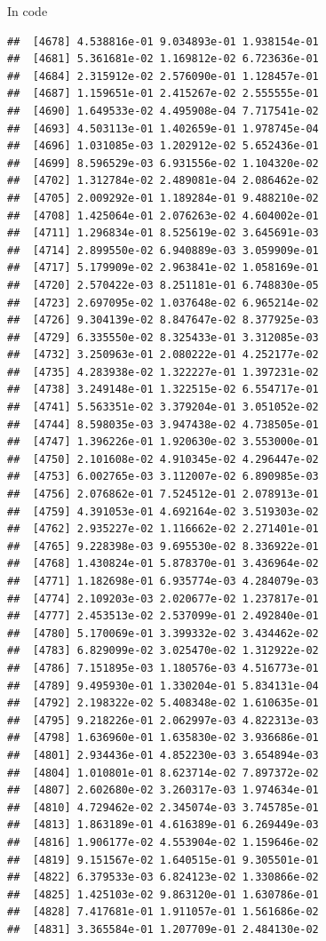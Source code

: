 \documentclass[ignorenonframetext,]{beamer}
\begin{document}
\begin{frame}[fragile]{In code}
\begin{verbatim}
##  [4678] 4.538816e-01 9.034893e-01 1.938154e-01
##  [4681] 5.361681e-02 1.169812e-02 6.723636e-01
##  [4684] 2.315912e-02 2.576090e-01 1.128457e-01
##  [4687] 1.159651e-01 2.415267e-02 2.555555e-01
##  [4690] 1.649533e-02 4.495908e-04 7.717541e-02
##  [4693] 4.503113e-01 1.402659e-01 1.978745e-04
##  [4696] 1.031085e-03 1.202912e-02 5.652436e-01
##  [4699] 8.596529e-03 6.931556e-02 1.104320e-02
##  [4702] 1.312784e-02 2.489081e-04 2.086462e-02
##  [4705] 2.009292e-01 1.189284e-01 9.488210e-02
##  [4708] 1.425064e-01 2.076263e-02 4.604002e-01
##  [4711] 1.296834e-01 8.525619e-02 3.645691e-03
##  [4714] 2.899550e-02 6.940889e-03 3.059909e-01
##  [4717] 5.179909e-02 2.963841e-02 1.058169e-01
##  [4720] 2.570422e-03 8.251181e-01 6.748830e-05
##  [4723] 2.697095e-02 1.037648e-02 6.965214e-02
##  [4726] 9.304139e-02 8.847647e-02 8.377925e-03
##  [4729] 6.335550e-02 8.325433e-01 3.312085e-03
##  [4732] 3.250963e-01 2.080222e-01 4.252177e-02
##  [4735] 4.283938e-02 1.322227e-01 1.397231e-02
##  [4738] 3.249148e-01 1.322515e-02 6.554717e-01
##  [4741] 5.563351e-02 3.379204e-01 3.051052e-02
##  [4744] 8.598035e-03 3.947438e-02 4.738505e-01
##  [4747] 1.396226e-01 1.920630e-02 3.553000e-01
##  [4750] 2.101608e-02 4.910345e-02 4.296447e-02
##  [4753] 6.002765e-03 3.112007e-02 6.890985e-03
##  [4756] 2.076862e-01 7.524512e-01 2.078913e-01
##  [4759] 4.391053e-01 4.692164e-02 3.519303e-02
##  [4762] 2.935227e-02 1.116662e-02 2.271401e-01
##  [4765] 9.228398e-03 9.695530e-02 8.336922e-01
##  [4768] 1.430824e-01 5.878370e-01 3.436964e-02
##  [4771] 1.182698e-01 6.935774e-03 4.284079e-03
##  [4774] 2.109203e-03 2.020677e-02 1.237817e-01
##  [4777] 2.453513e-02 2.537099e-01 2.492840e-01
##  [4780] 5.170069e-01 3.399332e-02 3.434462e-02
##  [4783] 6.829099e-02 3.025470e-02 1.312922e-02
##  [4786] 7.151895e-03 1.180576e-03 4.516773e-01
##  [4789] 9.495930e-01 1.330204e-01 5.834131e-04
##  [4792] 2.198322e-02 5.408348e-02 1.610635e-01
##  [4795] 9.218226e-01 2.062997e-03 4.822313e-03
##  [4798] 1.636960e-01 1.635830e-02 3.936686e-01
##  [4801] 2.934436e-01 4.852230e-03 3.654894e-03
##  [4804] 1.010801e-01 8.623714e-02 7.897372e-02
##  [4807] 2.602680e-02 3.260317e-03 1.974634e-01
##  [4810] 4.729462e-02 2.345074e-03 3.745785e-01
##  [4813] 1.863189e-01 4.616389e-01 6.269449e-03
##  [4816] 1.906177e-02 4.553904e-02 1.159646e-02
##  [4819] 9.151567e-02 1.640515e-01 9.305501e-01
##  [4822] 6.379533e-03 6.824123e-02 1.330866e-02
##  [4825] 1.425103e-02 9.863120e-01 1.630786e-01
##  [4828] 7.417681e-01 1.911057e-01 1.561686e-02
##  [4831] 3.365584e-01 1.207709e-01 2.484130e-02

\end{verbatim}
\end{frame}
\end{document}
